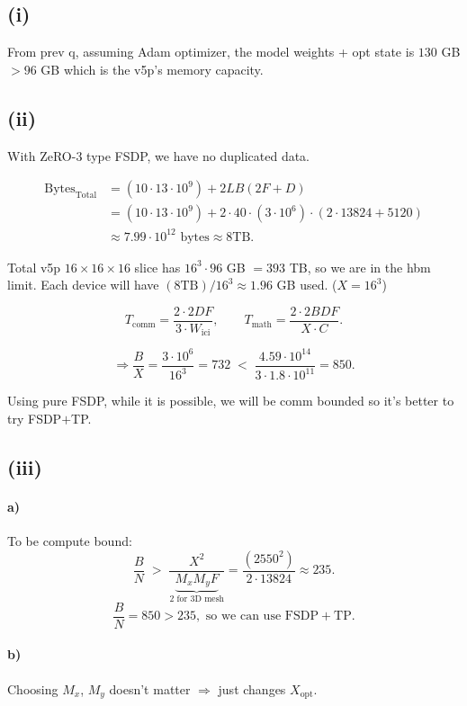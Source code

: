 \documentclass[11pt]{article}
\newcommand{\Tmath}{T_{\text{math}}}
\newcommand{\Tcomm}{T_{\text{comm}}}
\newcommand{\Wici}{W_{\text{ici}}}
\begin{document}
\subsection*{(i)}

From prev q, assuming Adam optimizer, the model weights + opt state is $130$ GB $> 96$ GB which is the v5p's memory capacity.

\subsection*{(ii)}

With ZeRO-3 type FSDP, we have no duplicated data.

\begin{align*}
\text{Bytes}_{\text{Total}} &= (10 \cdot 13 \cdot 10^9) + 2LB(2F + D) \\
&= (10 \cdot 13 \cdot 10^9) + 2 \cdot 40 \cdot (3 \cdot 10^6) \cdot (2 \cdot 13824 + 5120) \\
&\approx 7.99 \cdot 10^{12} \text{ bytes} \approx 8 \text{TB}.
\end{align*}

Total v5p $16 \times 16 \times 16$ slice has $16^3 \cdot 96$ GB $= 393$ TB, so we are in the hbm limit. Each device will have $(8 \text{TB})/16^3 \approx 1.96$ GB used. \quad ($X = 16^3$)

\[
\Tcomm = \frac{2 \cdot 2DF}{3 \cdot \Wici}, \qquad \Tmath = \frac{2 \cdot 2BDF}{X \cdot C}.
\]

\[
\Rightarrow \frac{B}{X} = \frac{3 \cdot 10^6}{16^3} = 732 \;<\; \frac{4.59 \cdot 10^{14}}{3 \cdot 1.8 \cdot 10^{11}} = 850.
\]

Using pure FSDP, while it is possible, we will be comm bounded so it's better to try FSDP$+$TP.

\subsection*{(iii)}

\paragraph{a)} To be compute bound:
\[
\frac{B}{N} \;>\; \frac{X^2}{\underbrace{M_x M_y F}_{\text{2 for 3D mesh}}}
= \frac{(2550^2)}{2 \cdot 13824} \approx 235.
\]
\[
\frac{B}{N} = 850 > 235, \text{ so we can use FSDP}+\text{TP.}
\]

\paragraph{b)} Choosing $M_x$, $M_y$ doesn't matter $\Rightarrow$ just changes $X_{\text{opt}}$.
\end{document}
